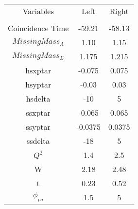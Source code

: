 \begin{center}
\begin{tabular}{||c|c|c||}\hline
 Variables & Left & Right \\
 & & \\\hline
Coincidence Time & -59.21 & -58.13 \\
$Missing Mass_\Lambda$ & 1.10 & 1.15 \\
$Missing Mass_\Sigma$ & 1.175 & 1.215 \\\hline
hsxptar & -0.075 & 0.075 \\
hsyptar & -0.03 & 0.03 \\
hsdelta & -10 & 5 \\
ssxptar & -0.065 & 0.065 \\
ssyptar & -0.0375 & 0.0375 \\
ssdelta & -18 & 5 \\\hline
$Q^2$ & 1.4 & 2.5 \\
W & 2.18 & 2.48 \\
t & 0.23 & 0.52 \\
$\phi_{pq}$ & 1.5 & 5 \\\hline
\end{tabular}
\end{center}